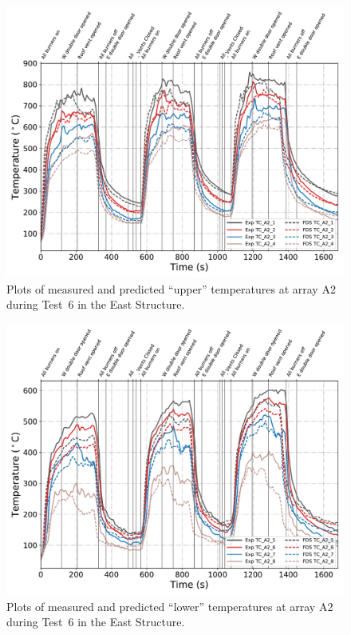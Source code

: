 \clearpage
\begin{figure}[p]
	\centering
	\includegraphics[width=\columnwidth]{Figures/Plots/Validation/Temperature/Test_6_TC_A2_upper}
	\caption{Plots of measured and predicted ``upper'' temperatures at array A2 during Test~6 in the East Structure.}
	\label{fig:TCA2_upper_data_Test6}
\end{figure}
\begin{figure}[p]
	\centering
	\includegraphics[width=\columnwidth]{Figures/Plots/Validation/Temperature/Test_6_TC_A2_lower}
	\caption{Plots of measured and predicted ``lower'' temperatures at array A2 during Test~6 in the East Structure.}
	\label{fig:TCA2_lower_data_Test6}
\end{figure}

